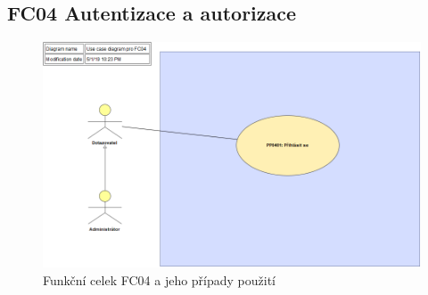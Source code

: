 \documentclass[thesis=M,czech]{FITthesis}[2019/12/23]
\begin{document}
\subsection{FC04 Autentizace a autorizace}
\label{FC04}
\begin{figure}[H]
  \centering
  \includegraphics[width=\textwidth]{res/design/Use case diagram pro FC04.png}
  \caption{Funkční celek FC04 a jeho případy použití}
  \label{fig:Funkční celek FC04 a jeho případy použití}
\end{figure}

\newpage
\end{document}
